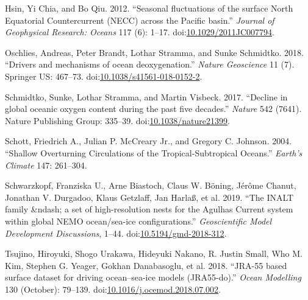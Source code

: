\documentclass[a4paperpaper,]{article}
\begin{document}
\hypertarget{ref-Hsin2012}{}
Hsin, Yi Chia, and Bo Qiu. 2012. ``Seasonal fluctuations of the surface
North Equatorial Countercurrent (NECC) across the Pacific basin.''
\emph{Journal of Geophysical Research: Oceans} 117 (6): 1--17.
doi:\href{https://doi.org/10.1029/2011JC007794}{10.1029/2011JC007794}.

\hypertarget{ref-Oschlies2018}{}
Oschlies, Andreas, Peter Brandt, Lothar Stramma, and Sunke Schmidtko.
2018. ``Drivers and mechanisms of ocean deoxygenation.'' \emph{Nature
Geoscience} 11 (7). Springer US: 467--73.
doi:\href{https://doi.org/10.1038/s41561-018-0152-2}{10.1038/s41561-018-0152-2}.

\hypertarget{ref-Schmidtko2017}{}
Schmidtko, Sunke, Lothar Stramma, and Martin Visbeck. 2017. ``Decline in
global oceanic oxygen content during the past five decades.''
\emph{Nature} 542 (7641). Nature Publishing Group: 335--39.
doi:\href{https://doi.org/10.1038/nature21399}{10.1038/nature21399}.

\hypertarget{ref-Schott2004}{}
Schott, Friedrich A., Julian P. McCreary Jr., and Gregory C. Johnson.
2004. ``Shallow Overturning Circulations of the Tropical-Subtropical
Oceans.'' \emph{Earth's Climate} 147: 261--304.

\hypertarget{ref-Schwarzkopf2019}{}
Schwarzkopf, Franziska U., Arne Biastoch, Claus W. Böning, Jérôme
Chanut, Jonathan V. Durgadoo, Klaus Getzlaff, Jan Harlaß, et al. 2019.
``The INALT family \&ndash; a set of high-resolution nests for the
Agulhas Current system within global NEMO ocean/sea-ice
configurations.'' \emph{Geoscientific Model Development Discussions},
1--44.
doi:\href{https://doi.org/10.5194/gmd-2018-312}{10.5194/gmd-2018-312}.

\hypertarget{ref-Tsujino2018}{}
Tsujino, Hiroyuki, Shogo Urakawa, Hideyuki Nakano, R. Justin Small, Who
M. Kim, Stephen G. Yeager, Gokhan Danabasoglu, et al. 2018. ``JRA-55
based surface dataset for driving ocean--sea-ice models (JRA55-do).''
\emph{Ocean Modelling} 130 (October): 79--139.
doi:\href{https://doi.org/10.1016/j.ocemod.2018.07.002}{10.1016/j.ocemod.2018.07.002}.
\end{document}
